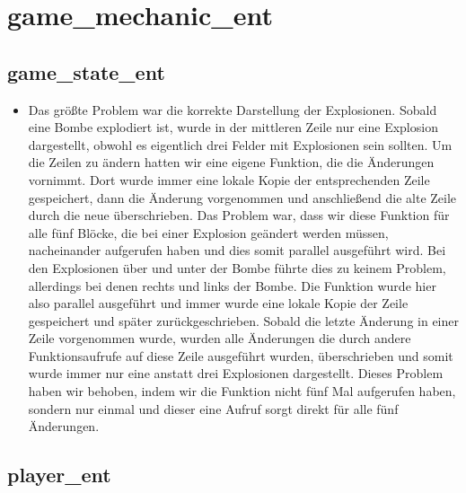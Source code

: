 \documentclass[parskip=full]{scrartcl}
\begin{document}
		\section{game\_mechanic\_ent}

			\subsection{game\_state\_ent}
				\begin{itemize}
					\item Das größte Problem war die korrekte Darstellung der Explosionen. Sobald eine Bombe explodiert ist, wurde in der mittleren Zeile nur eine Explosion dargestellt, obwohl es eigentlich drei Felder mit Explosionen sein sollten. Um die Zeilen zu ändern hatten wir eine eigene Funktion, die die Änderungen vornimmt. Dort wurde immer eine lokale Kopie der entsprechenden Zeile gespeichert, dann die Änderung vorgenommen und anschließend die alte Zeile durch die neue überschrieben. Das Problem war, dass wir diese Funktion für alle fünf Blöcke, die bei einer Explosion geändert werden müssen, nacheinander aufgerufen haben und dies somit parallel ausgeführt wird. Bei den Explosionen über und unter der Bombe führte dies zu keinem Problem, allerdings bei denen rechts und links der Bombe. Die Funktion wurde hier also parallel ausgeführt und immer wurde eine lokale Kopie der Zeile gespeichert und später zurückgeschrieben. Sobald die letzte Änderung in einer Zeile vorgenommen wurde, wurden alle Änderungen die durch andere Funktionsaufrufe auf diese Zeile ausgeführt wurden, überschrieben und somit wurde immer nur eine anstatt drei Explosionen dargestellt. Dieses Problem haben wir behoben, indem wir die Funktion nicht fünf Mal aufgerufen haben, sondern nur einmal und dieser eine Aufruf sorgt direkt für alle fünf Änderungen.
				\end{itemize}

			\subsection{player\_ent}
\end{document}

